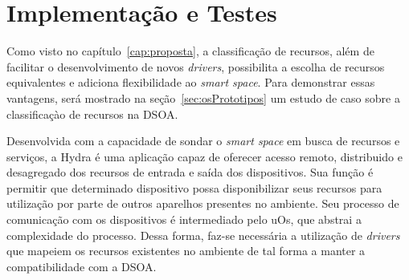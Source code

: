 \chapter{Implementação e Testes}

Como visto no capítulo~\ref{cap:proposta}, a classificação de recursos, além de facilitar o desenvolvimento de novos \emph{drivers}, possibilita a escolha de recursos equivalentes e adiciona flexibilidade ao \emph{smart space}. Para demonstrar essas vantagens, será mostrado na seção~\ref{sec:osPrototipos} um estudo de caso sobre a classificaçào de recursos na DSOA.



Desenvolvida com a capacidade de sondar o \emph{smart space} em busca de recursos e serviços, a Hydra é uma aplicação capaz de oferecer acesso remoto, distribuido e desagregado dos recursos de entrada e saída dos dispositivos. Sua função é permitir que determinado dispositivo possa disponibilizar seus recursos para utilização por parte de outros aparelhos presentes no ambiente. Seu processo de comunicação com os dispositivos é intermediado pelo uOs, que abstrai a complexidade do processo. Dessa forma, faz-se necessária a utilização de \emph{drivers} que mapeiem os recursos existentes no ambiente de tal forma a manter a compatibilidade com a DSOA.

\begin{comment}
A Hydra consiste em uma aplicação construída com o objetivo de explorar a forma como o ambiente é decomposto em recursos e serviços para possibilitar uma forma desagregada de acesso a recursos de entrada e saída dos dispositivos. Seu objetivo é permitir que um determinado dispositivo tenha seus recursos de entrada e saída redirecionados para outros dispositivos, repassando a estes o controle de sua operação.

A Hydra, trabalhando sobre o middleware uOS, percebe o ambiente como um conjunto
de recursos presentes. A comunicação entre a Hydra os recursos ocorre com intermédio do
uOS, abstraindo tanto da Hydra quando dos drivers o outro ponto de comunicação. Para
os drivers, não importa para quem estão sendo prestados os serviços, e cabe à aplicação
a escolha entre os recursos do ambiente.

Por trabalhar com os conceitos da DSOA (Seção 3.1), a Hydra vê os recursos do
ambiente de forma transparente, e pode fazer uso de qualquer recurso compatível com as
interfaces por ele esperadas e permite que outros dispositivos utilizem os mesmos recursos
do ambiente.

A aplicação Hydra se propõe a reconhecer determinados drivers e redirecionar seus
serviços corretamente.
\end{comment}

